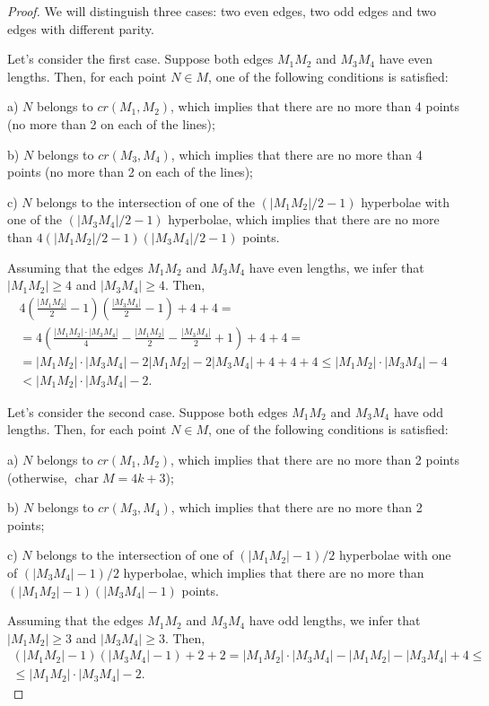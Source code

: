 \documentclass[a4paper,14pt]{article} %
\theoremstyle{plain}
\theoremstyle{definition}
\begin{document}
\begin{proof}
	We will distinguish three cases: two even edges, two odd edges and two edges with different parity.


	Let's consider the first case. Suppose both edges $M_1M_2$ and $M_3M_4$ have even lengths. Then, for each point $N\in M$, one of the following conditions is satisfied:

	a) $N$ belongs to $cr(M_1,M_2)$, which implies that there are no more than 4 points (no more than 2 on each of the lines);

	b) $N$ belongs to $cr(M_3,M_4)$, which implies that there are no more than 4 points (no more than 2 on each of the lines);

	c) $N$ belongs to the intersection of one of the $(|M_1M_2|/2 - 1)$ hyperbolae with one of the $(|M_3M_4|/2 - 1)$ hyperbolae, which implies that there are no more than $4(|M_1M_2|/2 - 1)(|M_3M_4|/2 - 1)$ points.

	Assuming that the edges $M_1M_2$ and $M_3M_4$ have even lengths,
	we infer that $|M_1M_2|\geq4$ and $|M_3M_4|\geq4$.
	Then,
	\begin{multline}
		4 \left(\frac{|M_1 M_2|}{2} - 1\right) \left(\frac{|M_3 M_4|}{2} - 1 \right) + 4 + 4
		=
		\\=
		 4\left(\frac{|M_1 M_2| \cdot |M_3 M_4|}{4} - \frac{|M_1 M_2|}{2} - \frac{|M_3 M_4|}{2}+1\right) + 4 + 4
		=
		\\=
		|M_1 M_2| \cdot |M_3 M_4| - 2 |M_1 M_2| - 2 |M_3 M_4| + 4 + 4 + 4
		\leq
		|M_1 M_2| \cdot |M_3 M_4| - 4 \\
		<
		|M_1 M_2| \cdot |M_3 M_4| - 2
		.
	\end{multline}

	Let's consider the second case. Suppose both edges $M_1M_2$ and $M_3M_4$ have odd lengths. Then, for each point $N\in M$, one of the following conditions is satisfied:

	a) $N$ belongs to $cr(M_1,M_2)$, which implies that there are no more than 2 points (otherwise, $\operatorname{char} M = 4k+3$);

	b) $N$ belongs to $cr(M_3,M_4)$, which implies that there are no more than 2 points;

	c) $N$ belongs to the intersection of one of $(|M_1 M_2|-1)/2$ hyperbolae with one of $(|M_3M_4|-1)/2$ hyperbolae, which implies that there are no more than $(|M_1 M_2|-1)(|M_3 M_4|-1)$ points.

	Assuming that the edges $M_1M_2$ and $M_3M_4$ have odd lengths,
	we infer that $|M_1M_2|\geq3$ and $|M_3M_4|\geq3$.
	Then,
	\begin{multline}
		(|M_1 M_2| - 1)(|M_3 M_4| - 1) + 2 + 2
		=
		|M_1 M_2| \cdot |M_3 M_4| - |M_1 M_2| - |M_3 M_4| + 4
		\leq \\
		\leq |M_1 M_2| \cdot |M_3 M_4| - 2
		.
	\end{multline}


\end{proof}
\end{document}

